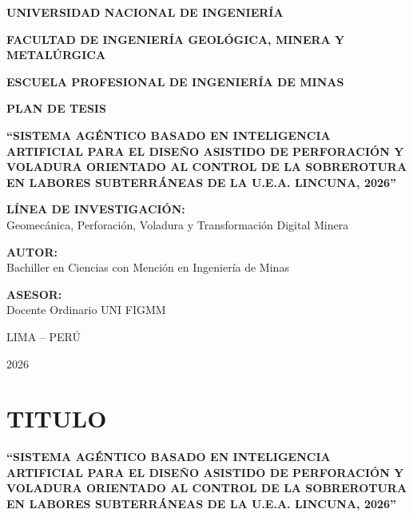 \documentclass[12pt,a4paper]{article}
\begin{document}
\begin{titlepage}
    \centering
    {\bfseries\Large UNIVERSIDAD NACIONAL DE INGENIERÍA\par}
    \vspace{0.3cm}
    {\bfseries\large FACULTAD DE INGENIERÍA GEOLÓGICA, MINERA Y METALÚRGICA\par}
    \vspace{0.2cm}
    {\bfseries\large ESCUELA PROFESIONAL DE INGENIERÍA DE MINAS\par}
    \vspace{1.5cm}
    
    {\bfseries\huge PLAN DE TESIS\par}
    \vspace{1.5cm}
    
    {\bfseries\Large “SISTEMA AGÉNTICO BASADO EN INTELIGENCIA ARTIFICIAL PARA EL DISEÑO ASISTIDO DE PERFORACIÓN Y VOLADURA ORIENTADO AL CONTROL DE LA SOBREROTURA EN LABORES SUBTERRÁNEAS DE LA U.E.A. LINCUNA, 2026”\par}
    \vspace{2.0cm}
    
    \textbf{LÍNEA DE INVESTIGACIÓN:}\\
    Geomecánica, Perforación, Voladura y Transformación Digital Minera\par
    \vspace{1.0cm}
    
    \textbf{AUTOR:}\\
    Bachiller en Ciencias con Mención en Ingeniería de Minas\par
    \vspace{0.8cm}
    
    \textbf{ASESOR:}\\
    Docente Ordinario UNI FIGMM\par
    \vfill
    
    {\large LIMA – PERÚ\par}
    {\large 2026\par}
\end{titlepage}

\tableofcontents
\newpage

\section{TITULO}
\textbf{“SISTEMA AGÉNTICO BASADO EN INTELIGENCIA ARTIFICIAL PARA EL DISEÑO ASISTIDO DE PERFORACIÓN Y VOLADURA ORIENTADO AL CONTROL DE LA SOBREROTURA EN LABORES SUBTERRÁNEAS DE LA U.E.A. LINCUNA, 2026”}
\end{document}
